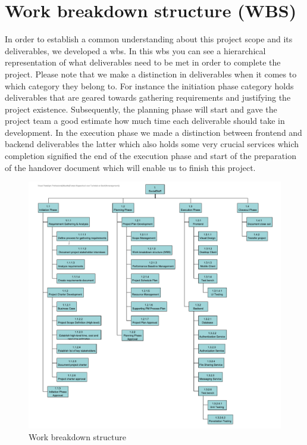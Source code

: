 \section{Work breakdown structure (WBS)}\label{sec:work-breakdown-structure-(wbs)}

In order to establish a common understanding about this project scope and its deliverables, we developed a \ac{wbs}.
In this \ac{wbs} you can see a hierarchical representation of what deliverables need to be met in order to complete
the project.
Please note that we make a distinction in deliverables when it comes to which category they belong to.
For instance the initiation phase category holds deliverables that are geared towards gathering requirements and
justifying the project existence.
Subsequently, the planning phase will start and gave the project team a good estimate how much time each deliverable
should take in development.
In the execution phase we made a distinction between frontend and backend deliverables the latter which also holds
some very crucial services which completion signified the end of the execution phase and start of the preparation of
the handover document which will enable us to finish this project.

\begin{figure}[H]
    \centering
    \includegraphics[width=1.0\textwidth]{./images/wbs}
    \caption{Work breakdown structure}
    \label{fig:figure40}
\end{figure}
